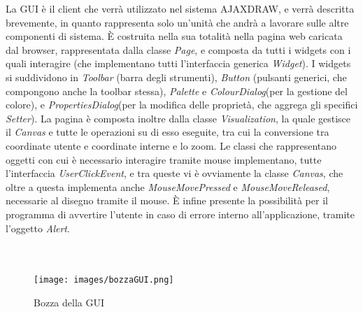 La GUI \` e  il client che verr\` a utilizzato nel sistema AJAXDRAW, e verr\` a descritta brevemente, in quanto rappresenta solo un'unit\` a che andr\`  a a lavorare sulle altre componenti di sistema. \` E costruita nella sua totalit\` a nella pagina web caricata dal browser, rappresentata dalla classe \textit{Page}, e composta da tutti i widgets con i quali interagire (che implementano tutti l'interfaccia generica \textit{Widget}).  I widgets si suddividono in \textit{Toolbar} (barra degli strumenti), \textit{Button} (pulsanti generici, che compongono anche la toolbar stessa), \textit{Palette} e \textit{ColourDialog}(per la gestione del colore), e \textit{PropertiesDialog}(per la modifica delle propriet\` a, che aggrega gli specifici \textit{Setter}). La pagina \` e composta inoltre dalla classe \textit{Visualization}, la quale gestisce il \textit{Canvas} e tutte le operazioni su di esso eseguite, tra cui la conversione tra coordinate utente e coordinate interne e lo zoom. Le classi che rappresentano oggetti con cui \`e necessario interagire tramite mouse implementano, tutte l'interfaccia \textit{UserClickEvent}, e tra queste vi \` e ovviamente la classe \textit{Canvas}, che oltre a questa implementa anche \textit{MouseMovePressed} e \textit{MouseMoveReleased}, necessarie al disegno tramite il mouse.  \` E infine presente la possibilit\` a per il programma di avvertire l'utente in caso di errore interno all'applicazione, tramite l'oggetto \textit{Alert}. \\ \\ \\

\begin{figure}[!ht]
\centering
\texttt{[image: images/bozzaGUI.png]}
\caption{Bozza della GUI}
\end{figure}

\newpage
{}

